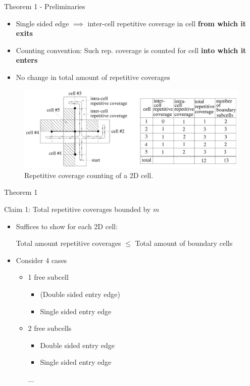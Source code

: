 \documentclass{beamer}
\begin{document}
\begin{frame}{Theorem 1 - Preliminaries}
    \begin{itemize}
        \item Single sided edge $\implies$ inter-cell repetitive coverage in cell \textbf{from which it exits}
        \item Counting convention: Such rep. coverage is counted for cell \textbf{into which it enters}
        \item No change in total amount of repetitive coverages
    \end{itemize}
    \begin{figure}
        \includegraphics[width=\linewidth]{Images/inv_fig9.png}
        \caption{Repetitive coverage counting of a 2D cell.}
    \end{figure}
\end{frame}


\begin{frame}{Theorem 1}
    \begin{block}{Claim 1: Total repetitive coverages bounded by $m$}
        \begin{itemize}
            \item Suffices to show for each 2D cell:

                  Total amount repetitive coverages $\leq$ Total amount of boundary cells
            \item Consider 4 cases
                  \begin{itemize}
                      \item 1 free subcell
                            \begin{itemize}
                                \item (Double sided entry edge)
                                \item Single sided entry edge
                            \end{itemize}
                      \item 2 free subcells
                            \begin{itemize}
                                \item Double sided entry edge
                                \item Single sided entry edge
                            \end{itemize}
                            ...
                  \end{itemize}
        \end{itemize}
    \end{block}
\end{frame}
\end{document}
